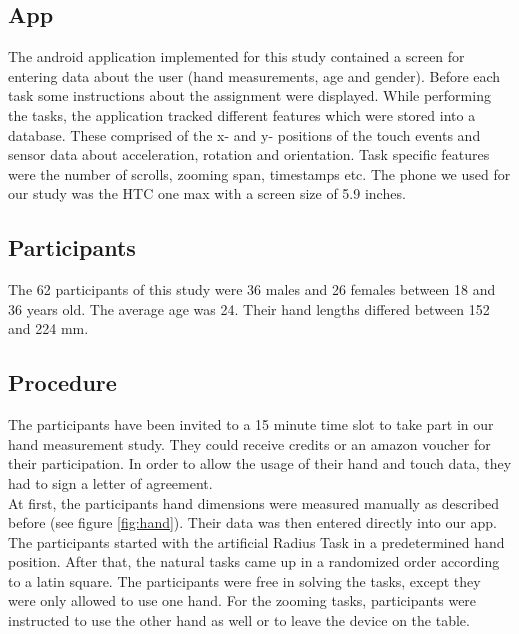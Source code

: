 \documentclass{sigchi}
\begin{document}
\subsection{App}
The android application implemented for this study contained a screen for entering data about the user (hand measurements, age and gender). Before each task some instructions about the assignment were displayed. While performing the tasks, the application tracked different features which were stored into a database. These comprised of the x- and y- positions of the touch events and sensor data about acceleration, rotation and orientation. Task specific features were the number of scrolls, zooming span, timestamps etc. The phone we used for our study was the HTC one max with a screen size of 5.9 inches.

\subsection{Participants}
The 62 participants of this study were 36 males and 26 females between 18 and 36 years old. The average age was 24. Their hand lengths differed between 152 and 224 mm.

\subsection{Procedure}
The participants have been invited to a 15 minute time slot to take part in our hand measurement study. They could receive credits or an amazon voucher for their participation. In order to allow the usage of their hand and touch data, they had to sign a letter of agreement.\\
At first, the participants hand dimensions were measured manually as described before (see figure \ref{fig:hand}). Their data was then entered directly into our app. The participants started with the artificial Radius Task in a predetermined hand position. After that, the natural tasks came up in a randomized order according to a latin square. The participants were free in solving the tasks, except they were only allowed to use one hand. For the zooming tasks, participants were instructed to use the other hand as well or to leave the device on the table.
\end{document}
